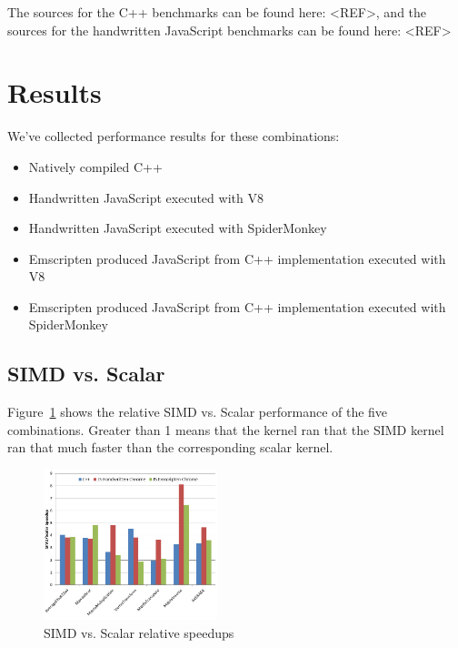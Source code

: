 \documentclass[preprint]{sigplanconf}
\begin{document}
The sources for the C++ benchmarks can be found here: <REF>, and the sources
for the handwritten JavaScript benchmarks can be found here: <REF>

\section{Results}

We've collected performance results for these combinations:

\begin{itemize}
\item
Natively compiled C++

\item
Handwritten JavaScript executed with V8

\item
Handwritten JavaScript executed with SpiderMonkey

\item
Emscripten produced JavaScript from C++ implementation executed with V8

\item
Emscripten produced JavaScript from C++ implementation executed with
SpiderMonkey
\end{itemize}

\subsection{SIMD vs. Scalar}

Figure~\ref{fig:simd-scalar-speedup} shows the relative SIMD vs. Scalar performance
of the five combinations.  Greater than 1 means that the kernel ran that the SIMD
kernel ran that much faster than the corresponding scalar kernel.

\begin{figure}
\begin{center}
\includegraphics[width=0.45\textwidth]{figures/simd-scalar-speedup.png}
\end{center}
\caption{SIMD vs. Scalar relative speedups}
\label{fig:simd-scalar-speedup}
\end{figure}
\end{document}
